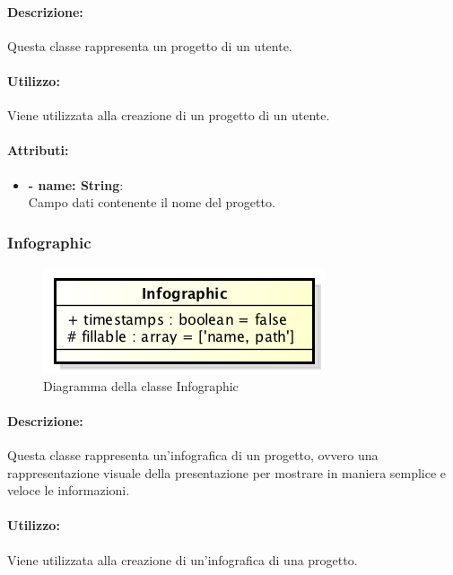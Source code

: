 	\paragraph{Descrizione:}
	Questa classe rappresenta un progetto di un utente.
	
	\paragraph{Utilizzo:}
	Viene utilizzata alla creazione di un progetto di un utente.
	
	\paragraph{Attributi:}
	\begin{itemize}
		\item \textbf{- name: String}:\\
			Campo dati contenente il nome del progetto.
	\end{itemize}


\newpage


\subsubsection{Infographic}

\begin{figure}[h]
	\centering
	\includegraphics[width=0.4\linewidth]{img/back_end_premi_model_infographic}
	\caption[Diagramma della classe Infographic]{Diagramma della classe Infographic}
	\label{fig:back_end_premi_model_infographic}
\end{figure}
	
	\paragraph{Descrizione:}
	Questa classe rappresenta un'\gls{infografica} di un progetto, ovvero una rappresentazione visuale della presentazione per mostrare in maniera semplice e veloce le informazioni.
	
	\paragraph{Utilizzo:}
	Viene utilizzata alla creazione di un'\gls{infografica} di una progetto.
	
